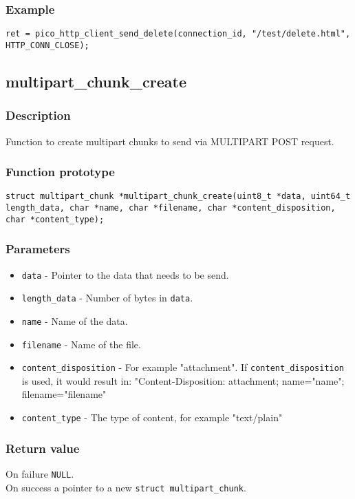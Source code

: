 \subsubsection*{Example}
\begin{verbatim}
ret = pico_http_client_send_delete(connection_id, "/test/delete.html", HTTP_CONN_CLOSE);
\end{verbatim}


\subsection{multipart\_chunk\_create}

\subsubsection*{Description}
Function to create multipart chunks to send via MULTIPART POST request. 

\subsubsection*{Function prototype}
\texttt{struct multipart\_chunk *multipart\_chunk\_create(uint8\_t *data, uint64\_t length\_data, char *name, char *filename, char *content\_disposition, char *content\_type);}

\subsubsection*{Parameters}
\begin{itemize}[noitemsep]
\item \texttt{data} - Pointer to the data that needs to be send.
\item \texttt{length\_data} - Number of bytes in \texttt{data}.
\item \texttt{name} - Name of the data.
\item \texttt{filename} - Name of the file.
\item \texttt{content\_disposition} - For example "attachment". If \texttt{content\_disposition} is used, it would result in: "Content-Disposition: attachment; name="name"; filename="filename"
\item \texttt{content\_type} - The type of content, for example "text/plain"
\end{itemize}
\subsubsection*{Return value}
On failure \texttt{NULL}.
\\On success a pointer to a new \texttt{struct multipart\_chunk}.

